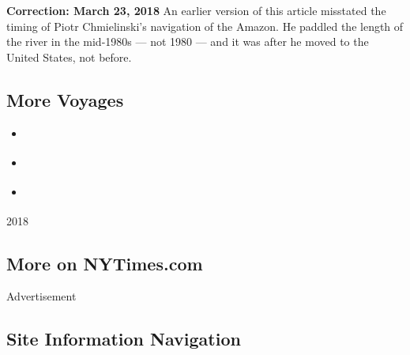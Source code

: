 \textbf{Correction: March 23, 2018} An earlier version of this article
misstated the timing of Piotr Chmielinski's navigation of the Amazon. He
paddled the length of the river in the mid-1980s --- not 1980 --- and it
was after he moved to the United States, not before.

\hypertarget{more-voyages}{%
\subsection{More Voyages}\label{more-voyages}}

\begin{itemize}
\tightlist
\item
  \href{https://www.nytimes3xbfgragh.onion/interactive/2018/03/22/magazine/voyages-worlds-greatest-hitchhiker.html?action=click\&module=MagazineModule\&pgtype=Article\&contentCollection=Magazine\&region=Footer}{}
\item
  \href{https://www.nytimes3xbfgragh.onion/interactive/2018/03/22/magazine/voyages-nathalie-cabrol-searching-mars-life-on-earth.html?action=click\&module=MagazineModule\&pgtype=Article\&contentCollection=Magazine\&region=Footer}{}
\item
  \href{https://www.nytimes3xbfgragh.onion/interactive/2018/03/22/magazine/voyages-joshua-tree-lost-hiker.html?action=click\&module=MagazineModule\&pgtype=Article\&contentCollection=Magazine\&region=Footer}{}
\end{itemize}

2018

\hypertarget{more-on-nytimescom}{%
\subsection{More on NYTimes.com}\label{more-on-nytimescom}}

Advertisement

\hypertarget{site-information-navigation}{%
\subsection{Site Information
Navigation}\label{site-information-navigation}}

